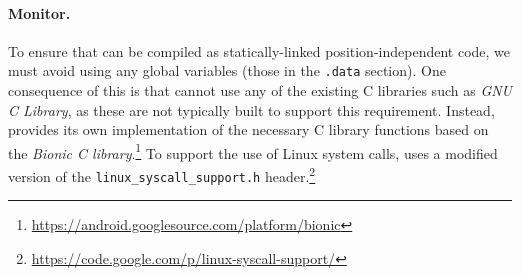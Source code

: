 \paragraph{Monitor.} To ensure that \varan can be compiled as
statically-linked position-independent code, we must avoid using any
global variables (\ie those in the \lstinline`.data` section). One
consequence of this is that \varan cannot use any of the existing C
libraries such as \emph{GNU C Library}, as these are not typically
built to support this requirement.  Instead, \varan provides its own
implementation of the necessary C library functions based on the
\emph{Bionic C
  library}.\footnote{\url{https://android.googlesource.com/platform/bionic}}
To support the use of Linux system calls, \varan uses a modified
version of the \lstinline`linux_syscall_support.h`
header.\footnote{\url{https://code.google.com/p/linux-syscall-support/}}







